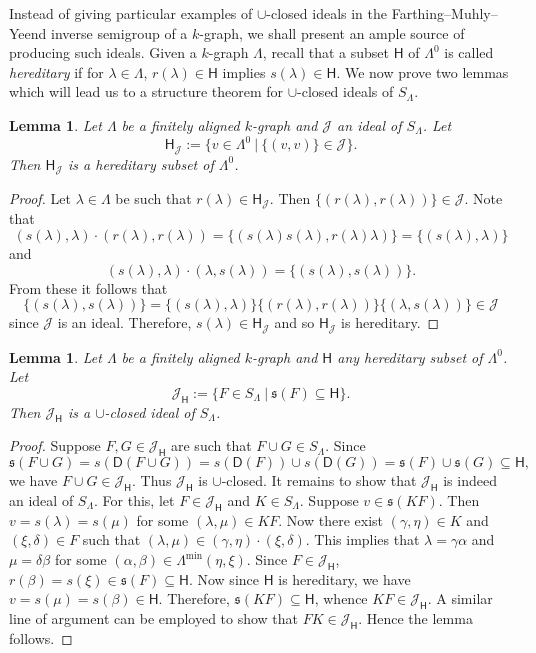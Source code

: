 \documentclass[a4paper,reqno,11pt]{amsart}
\numberwithin{equation}{section}
\newtheorem{lem}[thm]{Lemma}
\theoremstyle{definition}
\theoremstyle{remark}
\begin{document}
Instead of giving particular examples of $\cup$-closed ideals in the Farthing--Muhly--Yeend inverse semigroup of a $k$-graph, we shall present an ample source of producing such ideals. Given a $k$-graph $\Lambda$, recall that a subset $\mathsf{H}$ of $\Lambda^0$ is called \emph{hereditary} if for $\lambda\in \Lambda$, $r(\lambda)\in \mathsf{H}$ implies $s(\lambda)\in \mathsf{H}$. We now prove two lemmas which will lead us to a structure theorem for $\cup$-closed ideals of $S_\Lambda$.

\begin{lem}\label{lem ideal to hereditary subset}
Let $\Lambda$ be a finitely aligned $k$-graph and $\mathcal{J}$ an ideal of $S_\Lambda$. Let \[\mathsf{H}_\mathcal{J}:=\{v\in \Lambda^0~|~\{(v,v)\}\in \mathcal{J}\}.\] Then $\mathsf{H}_\mathcal{J}$ is a hereditary subset of $\Lambda^0$.    
\end{lem}
\begin{proof}
Let $\lambda\in \Lambda$ be such that $r(\lambda)\in \mathsf{H}_\mathcal{J}$. Then $\{(r(\lambda),r(\lambda))\}\in \mathcal{J}$. Note that \[(s(\lambda),\lambda)\cdot (r(\lambda),r(\lambda))=\{(s(\lambda)s(\lambda),r(\lambda)\lambda)\}=\{(s(\lambda),\lambda)\}\] and \[(s(\lambda),\lambda)\cdot (\lambda,s(\lambda))=\{(s(\lambda),s(\lambda))\}.\] From these it follows that \[\{(s(\lambda),s(\lambda))\}=\{(s(\lambda),\lambda)\}\{(r(\lambda),r(\lambda))\}\{(\lambda,s(\lambda))\}\in \mathcal{J}\] since $\mathcal{J}$ is an ideal. Therefore, $s(\lambda)\in \mathsf{H}_\mathcal{J}$ and so $\mathsf{H}_\mathcal{J}$ is hereditary.
\end{proof}
\begin{lem}\label{lem Hereditary subset to join closed ideal}
Let $\Lambda$ be a finitely aligned $k$-graph and $\mathsf{H}$ any hereditary subset of $\Lambda^0$. Let \[\mathcal{J}_\mathsf{H}:=\{F\in S_\Lambda~|~\mathfrak{s}(F)\subseteq \mathsf{H}\}.\] Then $\mathcal{J}_\mathsf{H}$ is a $\cup$-closed ideal of $S_\Lambda$.
\end{lem}
\begin{proof}
Suppose $F,G\in \mathcal{J}_\mathsf{H}$ are such that $F\cup G\in S_\Lambda$. Since \[\mathfrak{s}(F\cup G)=s(\mathsf{D}(F\cup G))=s(\mathsf{D}(F))\cup s(\mathsf{D}(G))=\mathfrak{s}(F)\cup \mathfrak{s}(G)\subseteq \mathsf{H},\] we have $F\cup G\in \mathcal{J}_\mathsf{H}$. Thus $\mathcal{J}_\mathsf{H}$ is $\cup$-closed. It remains to show that $\mathcal{J}_\mathsf{H}$ is indeed an ideal of $S_\Lambda$. For this, let $F\in \mathcal{J}_\mathsf{H}$ and $K\in S_\Lambda$. Suppose $v\in \mathfrak{s}(KF)$. Then $v=s(\lambda)=s(\mu)$ for some $(\lambda,\mu)\in KF$. Now there exist $(\gamma,\eta)\in K$ and $(\xi,\delta)\in F$ such that $(\lambda,\mu)\in (\gamma,\eta)\cdot (\xi,\delta)$. This implies that $\lambda=\gamma\alpha$ and $\mu=\delta\beta$ for some $(\alpha,\beta)\in \Lambda^{\min}(\eta,\xi)$. Since $F\in \mathcal{J}_\mathsf{H}$, $r(\beta)=s(\xi)\in \mathfrak{s}(F)\subseteq \mathsf{H}$. Now since $\mathsf{H}$ is hereditary, we have $v=s(\mu)=s(\beta)\in \mathsf{H}$. Therefore, $\mathfrak{s}(KF)\subseteq \mathsf{H}$, whence $KF\in \mathcal{J}_\mathsf{H}$. A similar line of argument can be employed to show that $FK\in \mathcal{J}_\mathsf{H}$. Hence the lemma follows. 
\end{proof}
\end{document}
